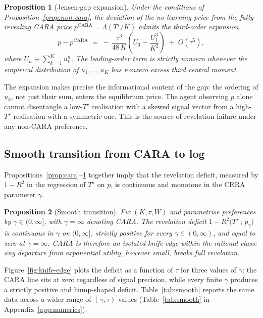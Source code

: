 \documentclass[12pt,letterpaper]{article}
\newtheorem{proposition}{Proposition}
\theoremstyle{definition}
\theoremstyle{remark}
\newcommand{\Lam}{\Lambda}            %
\newcommand{\Tstar}{T^{\!\star}}
\newcommand{\1}{\mathbf{1}}
\begin{document}
\begin{proposition}[Jensen-gap expansion]\label{prop:jensen}
Under the conditions of Proposition~\ref{prop:non-cara}, the deviation of
the no-learning price from the fully-revealing CARA price
$p^{\mathrm{CARA}}=\Lam(\Tstar/K)$ admits the third-order expansion
\begin{equation}
   p - p^{\mathrm{CARA}}
   \;=\; -\,\frac{\tau^{3}}{48\,K}\!\left(U_{3}-\frac{U_{1}^{3}}{K^{2}}\right)
   \;+\; O(\tau^{5}),
\label{eq:jensen}
\end{equation}
where $U_{n}\equiv\sum_{k=1}^{K}u_{k}^{n}$. The leading-order term is
strictly nonzero whenever the empirical distribution of $u_{1},\ldots,u_{K}$
has nonzero excess third central moment.
\end{proposition}

The expansion makes precise the informational content of the gap: the
ordering of $u_{k}$, not just their sum, enters the equilibrium price. The
agent observing $p$ alone cannot disentangle a low-$\Tstar$ realisation with
a skewed signal vector from a high-$\Tstar$ realisation with a symmetric
one. This is the source of revelation failure under any non-CARA preference.

\subsection{Smooth transition from CARA to log}

Propositions~\ref{prop:cara}--\ref{prop:jensen} together imply that the
revelation deficit, measured by $1-R^{2}$ in the regression of $\Tstar$ on
$p$, is continuous and monotone in the CRRA parameter $\gamma$.

\begin{proposition}[Smooth transition]\label{prop:smooth}
Fix $(K,\tau,W)$ and parametrise preferences by $\gamma\in(0,\infty]$, with
$\gamma=\infty$ denoting CARA. The revelation deficit
\(1-R^{2}\bigl(\Tstar\,;\,p_{\gamma}\bigr)\) is continuous in $\gamma$ on
$(0,\infty]$, strictly positive for every $\gamma\in(0,\infty)$, and equal
to zero at $\gamma=\infty$. CARA is therefore an isolated knife-edge within
the rational class: any departure from exponential utility, however small,
breaks full revelation.
\end{proposition}

Figure~\ref{fig:knife-edge} plots the deficit as a function of $\tau$ for
three values of $\gamma$: the CARA line sits at zero regardless of signal
precision, while every finite $\gamma$ produces a strictly positive and
hump-shaped deficit. Table~\ref{tab:smooth} reports the same data across
a wider range of $(\gamma,\tau)$ values (Table~\ref{tab:smooth} in
Appendix~\ref{app:numerics}).
\end{document}
